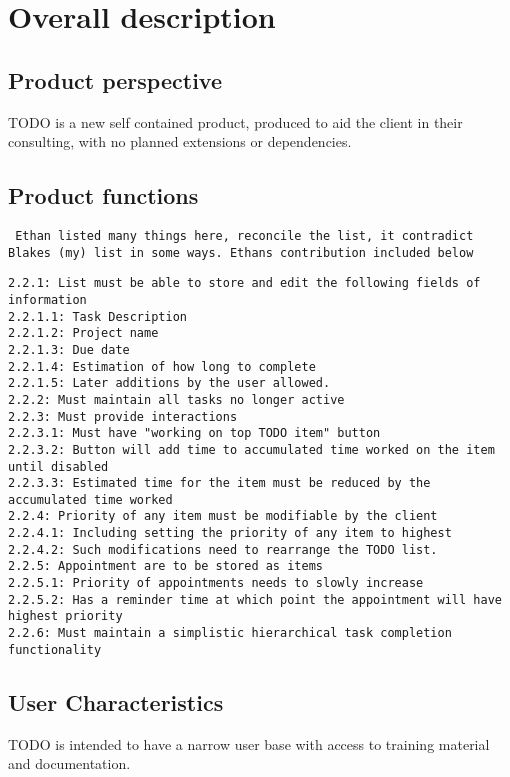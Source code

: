\documentclass[12pt,a4paper]{article}
\begin{document}
\section{Overall description}
\subsection{Product perspective}
TODO is a new self contained product, produced to aid the client in their consulting, with no planned extensions or dependencies.

\subsection{Product functions}
{\tt
Ethan listed many things here, reconcile the list, it contradict Blakes (my) list in some ways. Ethans contribution included below\\}
\begin{verbatim}
2.2.1: List must be able to store and edit the following fields of information
2.2.1.1: Task Description
2.2.1.2: Project name
2.2.1.3: Due date
2.2.1.4: Estimation of how long to complete
2.2.1.5: Later additions by the user allowed.
2.2.2: Must maintain all tasks no longer active
2.2.3: Must provide interactions
2.2.3.1: Must have "working on top TODO item" button 
2.2.3.2: Button will add time to accumulated time worked on the item until disabled
2.2.3.3: Estimated time for the item must be reduced by the accumulated time worked
2.2.4: Priority of any item must be modifiable by the client
2.2.4.1: Including setting the priority of any item to highest
2.2.4.2: Such modifications need to rearrange the TODO list.
2.2.5: Appointment are to be stored as items
2.2.5.1: Priority of appointments needs to slowly increase
2.2.5.2: Has a reminder time at which point the appointment will have highest priority
2.2.6: Must maintain a simplistic hierarchical task completion functionality
\end{verbatim}

\subsection{User Characteristics}
TODO is intended to have a narrow user base with access to training material and documentation. 

\end{document}
